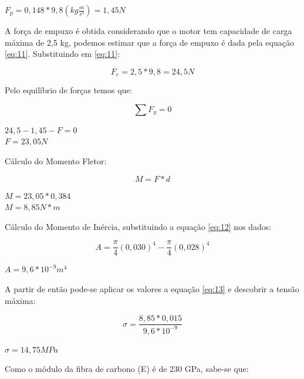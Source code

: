 \begin{center}
  $F_p = 0,148 * 9,8 (kg \frac{m}{s^2}) = 1,45N$
 
\end{center}

A força de empuxo é obtida considerando que o motor tem capacidade de carga máxima de 2,5 kg,
podemos estimar que a força de empuxo é dada pela equação \ref{eq:11}.
Substituindo em \ref{eq:11}: 

\begin{equation}
 F_e =2,5 * 9,8=24,5 N
\end{equation}

Pelo equilíbrio de forças temos que:

\begin{equation}
 \sum {F_y} = 0
\end{equation}

\begin{center}
 $24,5 - 1,45 - F = 0$\\
 $F = 23,05N$
\end{center}

Cálculo do Momento Fletor:

  \begin{equation}
    M = F*d
  \end{equation}
  
  \begin{center}
   $M = 23,05 * 0,384$ \\
   $M = 8,85 N*m$
  \end{center}

Cálculo do Momento de Inércia, substituindo a equação \ref{eq:12} nos dados:

\begin{equation}
 A= \frac{\pi}{4}({0,030}) ^ {4} -  \frac{\pi}{4}({0,028}) ^ {4}
\end{equation}
% 
 \begin{center}
 $ A = 9,6 * {10} ^ {-9}   {m} ^ {4}$
\end{center}

A partir de então pode-se aplicar os valores a equação \ref{eq:13} e descobrir a tensão máxima:

\begin{equation}
 \sigma = \frac{8,85*0,015}{9,6 *{10} ^ {-9}}
\end{equation}

\begin{center}
 $\sigma = 14,75 MPa$
\end{center}

Como o módulo da fibra de carbono (E) é de 230 GPa, sabe-se que:

